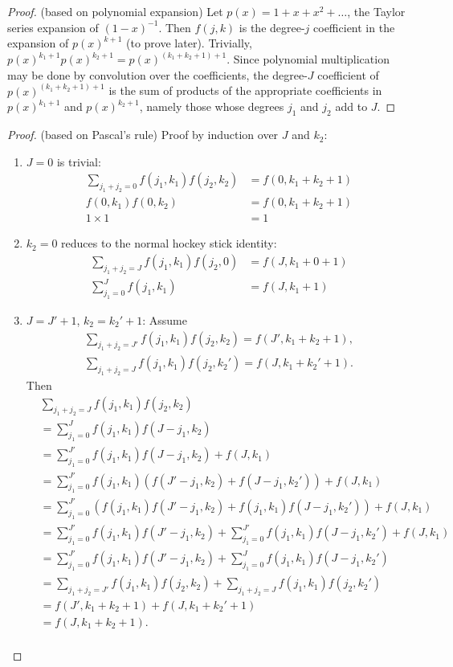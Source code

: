 \documentclass{article}
\begin{document}
\begin{proof}
  (based on polynomial expansion)
  Let $p(x)=1+x+x^2+\ldots$, the Taylor series expansion of $(1-x)^{-1}$.
  Then $f(j, k)$ is the degree-$j$ coefficient in the expansion of $p(x)^{k+1}$ (to prove later).
  Trivially, $p(x)^{k_1+1}p(x)^{k_2+1}=p(x)^{(k_1+k_2+1)+1}$.
  Since polynomial multiplication may be done by convolution over the coefficients,
  the degree-$J$ coefficient of $p(x)^{(k_1+k_2+1)+1}$ is the sum of products
  of the appropriate coefficients in $p(x)^{k_1+1}$ and $p(x)^{k_2+1}$,
  namely those whose degrees $j_1$ and $j_2$ add to $J$.
\end{proof}

\begin{proof}
  (based on Pascal's rule)
  Proof by induction over $J$ and $k_2$:
  \begin{enumerate}
  \item $J=0$ is trivial:
    \begin{align*}
      \sum_{j_1+j_2=0}f(j_1, k_1)f(j_2, k_2) &= f(0, k_1+k_2+1) \\
      f(0, k_1)f(0, k_2) &= f(0, k_1+k_2+1) \\
      1\times1 &= 1
    \end{align*}
  \item $k_2=0$ reduces to the normal hockey stick identity:
    \begin{align*}
      \sum_{j_1+j_2=J}f(j_1, k_1)f(j_2, 0) &= f(J, k_1+0+1) \\
      \sum_{j_1=0}^{J}f(j_1, k_1) &= f(J, k_1+1)
    \end{align*}
  \item $J=J'+1$, $k_2=k_2'+1$: Assume
    \begin{align*}
      \sum_{j_1+j_2=J'}f(j_1, k_1)f(j_2, k_2) = f(J', k_1+k_2+1), \\
      \sum_{j_1+j_2=J}f(j_1, k_1)f(j_2, k_2') = f(J, k_1+k_2'+1).
    \end{align*}
    Then
    \begin{align*}
      & \sum_{j_1+j_2=J}f(j_1, k_1)f(j_2, k_2) \\
      &= \sum_{j_1=0}^{J}f(j_1, k_1)f(J-j_1, k_2) \\
      &= \sum_{j_1=0}^{J'}f(j_1, k_1)f(J-j_1, k_2)+f(J, k_1) \\
      &= \sum_{j_1=0}^{J'}f(j_1, k_1)(f(J'-j_1, k_2)+f(J-j_1, k_2'))+f(J, k_1) \\
      &= \sum_{j_1=0}^{J'}(f(j_1, k_1)f(J'-j_1, k_2)+f(j_1, k_1)f(J-j_1, k_2'))+f(J, k_1) \\
      &= \sum_{j_1=0}^{J'}f(j_1, k_1)f(J'-j_1, k_2)+\sum_{j_1=0}^{J'}f(j_1, k_1)f(J-j_1, k_2')+f(J, k_1) \\
      &= \sum_{j_1=0}^{J'}f(j_1, k_1)f(J'-j_1, k_2)+\sum_{j_1=0}^{J}f(j_1, k_1)f(J-j_1, k_2') \\
      &= \sum_{j_1+j_2=J'}f(j_1, k_1)f(j_2, k_2)+\sum_{j_1+j_2=J}f(j_1, k_1)f(j_2, k_2') \\
      &= f(J', k_1+k_2+1)+f(J, k_1+k_2'+1) \\
      &= f(J, k_1+k_2+1). \\
    \end{align*}
  \end{enumerate}
\end{proof}
\end{document}
